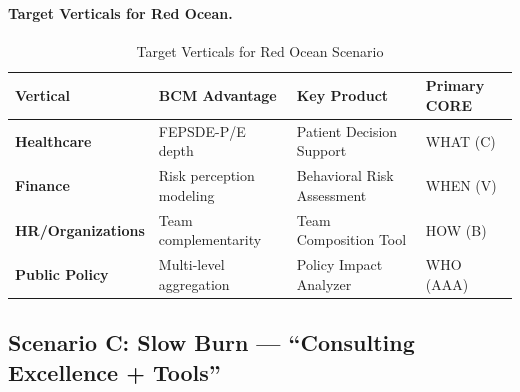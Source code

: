 \paragraph{Target Verticals for Red Ocean.}

\begin{table}[htbp]
\centering
\caption{Target Verticals for Red Ocean Scenario}
\label{tab:vvv-verticals}
\renewcommand{\arraystretch}{1.3}
\begin{tabular}{@{}lp{3cm}p{3cm}p{3cm}@{}}
\toprule
\textbf{Vertical} & \textbf{BCM Advantage} & \textbf{Key Product} & \textbf{Primary CORE} \\
\midrule
\textbf{Healthcare} & FEPSDE-P/E depth & Patient Decision Support & WHAT (C) \\
\textbf{Finance} & Risk perception modeling & Behavioral Risk Assessment & WHEN (V) \\
\textbf{HR/Organizations} & Team complementarity & Team Composition Tool & HOW (B) \\
\textbf{Public Policy} & Multi-level aggregation & Policy Impact Analyzer & WHO (AAA) \\
\bottomrule
\end{tabular}
\end{table}


\subsection{Scenario C: Slow Burn --- ``Consulting Excellence + Tools''}

